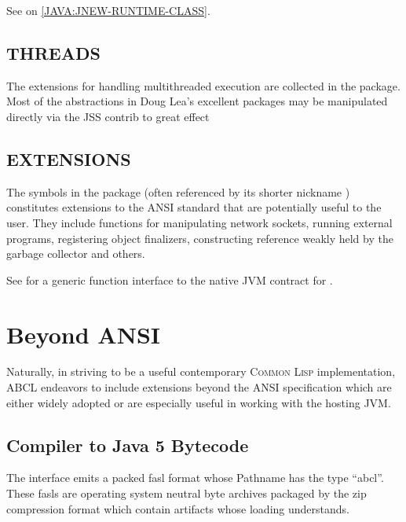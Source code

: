 \documentclass[10pt]{book}
\begin{document}
See  on \ref{JAVA:JNEW-RUNTIME-CLASS}.



\section{THREADS}

The extensions for handling multithreaded execution are collected in
the  package.  Most of the abstractions in Doug Lea's
excellent  packages may be manipulated
directly via the JSS contrib to great effect \cite{lea-1998}



\section{EXTENSIONS}

The symbols in the  package (often referenced by its
shorter nickname ) constitutes extensions to the
\textsc{ANSI} standard that are potentially useful to the user.  They
include functions for manipulating network sockets, running external
programs, registering object finalizers, constructing reference weakly
held by the garbage collector and others.

See \cite{RHODES2007} for a generic function interface to the native
\textsc{JVM} contract for .



\chapter{Beyond ANSI}

Naturally, in striving to be a useful contemporary \textsc{Common Lisp}
implementation, \textsc{ABCL} endeavors to include extensions beyond the ANSI
specification which are either widely adopted or are especially useful
in working with the hosting \textsc{JVM}.

\section{Compiler to Java 5 Bytecode}

The  interface emits a packed fasl format whose
Pathname has the type  ``abcl''.  These fasls are operating system neutral
byte archives packaged by the zip compression format which contain
artifacts whose loading  understands.
\end{document}
